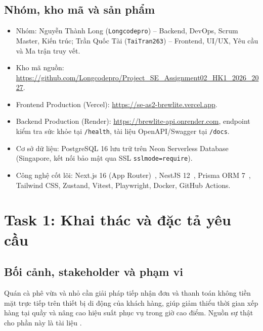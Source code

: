 \documentclass[12pt, a4paper]{article}
\newcommand{\tenLong}{Nguyễn Thành Long}
\newcommand{\tenTai}{Trần Quốc Tài}
\begin{document}
\subsection{Nhóm, kho mã và sản phẩm}
\begin{itemize}
  \item Nhóm: \tenLong{} (\texttt{Longcodepro}) -- Backend, DevOps, Scrum Master, Kiến trúc; \tenTai{} (\texttt{TaiTran263}) -- Frontend, UI/UX, Yêu cầu và Ma trận truy vết.
  \item Kho mã nguồn: \url{https://github.com/Longcodepro/Project_SE_Assignment02_HK1_2026_2027}.
  \item Frontend Production (Vercel): \url{https://se-as2-brewlite.vercel.app}.
  \item Backend Production (Render): \url{https://brewlite-api.onrender.com}, endpoint kiểm tra sức khỏe tại \texttt{/health}, tài liệu OpenAPI/Swagger tại \texttt{/docs}.
  \item Cơ sở dữ liệu: PostgreSQL 16 lưu trữ trên Neon Serverless Database (Singapore, kết nối bảo mật qua SSL \texttt{sslmode=require}).
  \item Công nghệ cốt lõi: Next.js 16 (App Router)~\cite{next}, NestJS 12~\cite{nest}, Prisma ORM 7~\cite{prisma}, Tailwind CSS, Zustand, Vitest, Playwright, Docker, GitHub Actions.
\end{itemize}

\section{Task 1: Khai thác và đặc tả yêu cầu}
\subsection{Bối cảnh, stakeholder và phạm vi}
Quán cà phê vừa và nhỏ cần giải pháp tiếp nhận đơn và thanh toán không tiền mặt trực tiếp trên thiết bị di động của khách hàng,
giúp giảm thiểu thời gian xếp hàng tại quầy và nâng cao hiệu suất phục vụ trong giờ cao điểm.
Nguồn sự thật cho phần này là tài liệu .
\end{document}
